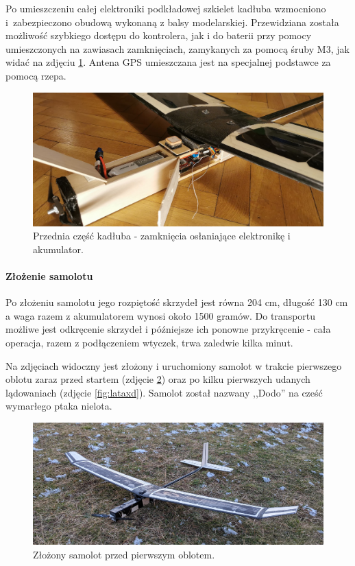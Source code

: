 \documentclass[12pt, a4paper]{article}
\begin{document}
Po umieszczeniu całej elektroniki podkładowej szkielet kadłuba wzmocniono i~zabezpieczono obudową wykonaną z balsy modelarskiej. Przewidziana została możliwość szybkiego dostępu do kontrolera, jak i do baterii przy pomocy umieszczonych na zawiasach zamknięciach, zamykanych za pomocą śruby M3, jak widać na zdjęciu \ref{fig:przod}. Antena GPS umieszczana jest na specjalnej podstawce za pomocą rzepa.

\begin{figure}[ht]
    \centering
    \includegraphics[width=1\textwidth]{przod}
    \caption{Przednia część kadłuba - zamknięcia osłaniające elektronikę i akumulator.}
    \label{fig:przod}
\end{figure}

\FloatBarrier
\paragraph{Złożenie samolotu}\mbox{}

Po złożeniu samolotu jego rozpiętość skrzydeł jest równa 204 cm, długość 130 cm a waga razem z akumulatorem wynosi około 1500 gramów. Do transportu możliwe jest odkręcenie skrzydeł i późniejsze ich ponowne przykręcenie - cała operacja, razem z podłączeniem wtyczek, trwa zaledwie kilka minut. 

Na zdjęciach widoczny jest złożony i uruchomiony samolot w trakcie pierwszego oblotu zaraz przed startem (zdjęcie \ref{fig:gotowy}) oraz po kilku pierwszych udanych lądowaniach (zdjęcie \ref{fig:lataxd}). Samolot został nazwany ,,Dodo'' na cześć wymarłego ptaka nielota. 

\begin{figure}[ht]
    \centering
    \includegraphics[width=1\textwidth]{dolotu}
    \caption{Złożony samolot przed pierwszym oblotem.}
    \label{fig:gotowy}
\end{figure}
\end{document}
